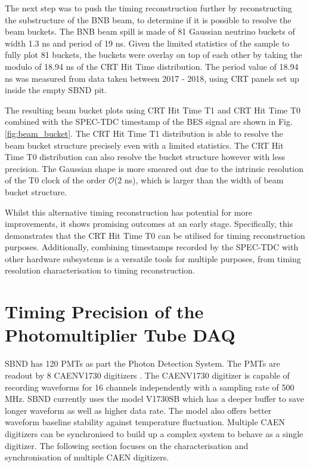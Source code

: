 The next step was to push the timing reconstruction further by reconstructing the substructure of the BNB beam, to determine if it is possible to resolve the beam buckets.
The BNB beam spill is made of 81 Gaussian neutrino buckets of width 1.3 ns and period of 19 ns.
Given the limited statistics of the sample to fully plot 81 buckets, the buckets were overlay on top of each other by taking the modulo of 18.94 ns of the CRT Hit Time distribution.
The period value of 18.94 ns was measured from data taken between 2017 - 2018, using CRT panels set up inside the empty SBND pit.

The resulting beam bucket plots using CRT Hit Time T1 and CRT Hit Time T0 combined with the SPEC-TDC timestamp of the BES signal are shown in Fig. \ref{fig:beam_bucket}.
The CRT Hit Time T1 distribution is able to resolve the beam bucket structure precisely even with a limited statistics.
The CRT Hit Time T0 distribution can also resolve the bucket structure however with less precision. 
The Gaussian shape is more smeared out due to the intrinsic resolution of the T0 clock of the order $\mathcal{O}$(2 ns), which is larger than the width of beam bucket structure.

Whilst this alternative timing reconstruction has potential for more improvements, it shows promising outcomes at an early stage.
Specifically, this demonstrates that the CRT Hit Time T0 can be utilised for timing reconstruction purposes. 
Additionally, combining timestamps recorded by the SPEC-TDC with other hardware subsystems is a versatile tools for multiple purposes, from timing resolution characterisation to timing reconstruction.

\section{Timing Precision of the Photomultiplier Tube DAQ}
\label{section5.4}

SBND has 120 PMTs as part the Photon Detection System. 
The PMTs are readout by 8 CAENV1730 digitizers \cite{}.
The CAENV1730 digitizer is capable of recording waveforms for 16 channels independently with a sampling rate of 500 MHz.
SBND currently uses the model V1730SB which has a deeper buffer to save longer waveform as well as higher data rate.
The model also offers better waveform baseline stability against temperature fluctuation.
Multiple CAEN digitizers can be synchronised to build up a complex system to behave as a single digitizer.
The following section focuses on the characterisation and synchronisation of multiple CAEN digitizers.

